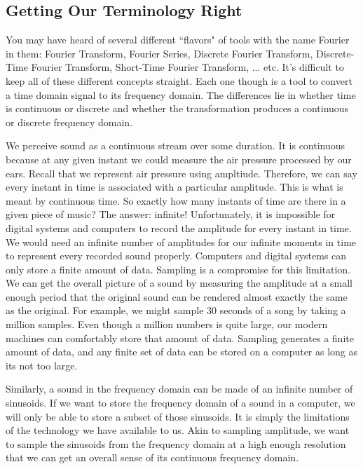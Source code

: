 \subsection*{Getting Our Terminology Right}

You may have heard of several different ``flavors" of tools with the name Fourier in them: Fourier Transform,
Fourier Series, Discrete Fourier Transform, Discrete-Time Fourier Transform, Short-Time Fourier Transform, ... etc.
It's difficult to keep all of these different concepts straight.  Each one though is a tool to convert a time domain
signal to its frequency domain.  The differences lie in whether time is continuous or discrete and whether the
transformation produces a continuous or discrete frequency domain. 

We perceive sound as a continuous stream over some duration.  It is continuous because at any given instant
we could measure the air pressure processed by our ears.  Recall that we represent air pressure using
ampltiude.  Therefore, we can say every instant in time is associated with a particular amplitude.  This is what
is meant by continuous time.  So exactly how many instants of time are there in a given piece of music?
The answer: infinite!  Unfortunately, it is impossible for
digital systems and computers to record the amplitude for every instant in time.  We would need an infinite 
number of amplitudes for our infinite moments in
time to represent every recorded sound properly.  Computers and digital systems can only store a finite amount of data.  Sampling is a compromise for
this limitation.   We can get the overall picture of a sound by 
measuring the amplitude at a small enough period that the original sound can be rendered 
almost exactly the same as the original.  For example, we might sample 30 seconds of a song by taking
a million samples.  Even though a million numbers is quite large, our modern machines can comfortably
store that amount of data.  Sampling generates a finite amount of data, and any finite set of data can be
stored on a computer as long as its not too large.

Similarly, a sound in the frequency domain can be made of an infinite number of sinusoids.  If
we want to store the frequency domain of a sound in a computer, we will only be able to store a subset of those
sinusoids.  It is simply the limitations of the technology we have available to us.  Akin to sampling amplitude,
we want to sample the sinusoids from the frequency domain at a high enough resolution that we can get
an overall sense of its continuous frequency domain.

